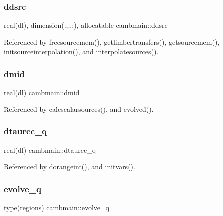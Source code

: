 \subsubsection{\texorpdfstring{ddsrc}{ddsrc}}
{\footnotesize\ttfamily real(dl), dimension(\+:,\+:,\+:), allocatable cambmain\+::ddsrc\hspace{0.3cm}{\ttfamily [private]}}



Referenced by freesourcemem(), getlimbertransfers(), getsourcemem(), initsourceinterpolation(), and interpolatesources().

\mbox{\label{namespacecambmain_a926ceb33a98900b90f263443b550e391}} 
\subsubsection{\texorpdfstring{dmid}{dmid}}
{\footnotesize\ttfamily real(dl) cambmain\+::dmid\hspace{0.3cm}{\ttfamily [private]}}



Referenced by calcscalarsources(), and evolved().

\mbox{\label{namespacecambmain_a0c8e31379dc1ff5e59d2da0bf1afcb8f}} 
\subsubsection{\texorpdfstring{dtaurec\+\_\+q}{dtaurec\_q}}
{\footnotesize\ttfamily real(dl) cambmain\+::dtaurec\+\_\+q\hspace{0.3cm}{\ttfamily [private]}}



Referenced by dorangeint(), and initvars().

\mbox{\label{namespacecambmain_a5ec3a97db7f68f99f47c3b077bbe3cda}} 
\subsubsection{\texorpdfstring{evolve\+\_\+q}{evolve\_q}}
{\footnotesize\ttfamily type(regions) cambmain\+::evolve\+\_\+q\hspace{0.3cm}{\ttfamily [private]}}



